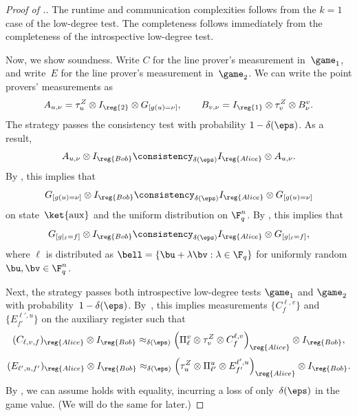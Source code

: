 \begin{proof}[Proof of .]
The runtime and communication complexities follows from the $k=1$ case of the low-degree test.
The completeness follows immediately from the completeness of the introspective low-degree test.

Now, we show soundness.
Write $C$ for the line prover's measurement in~$\game_1$,
and write~$E$ for the line prover's measurement in~$\game_2$.
We can write the point provers' measurements as
\begin{equation*}
A_{u, \nu} = \tau_u^Z \otimes I_{\reg{2}} \otimes G_{[g(u)=\nu]},
\qquad B_{v, \nu} = I_{\reg{1}} \otimes \tau_v^Z \otimes B^v_\nu.
\end{equation*}
The strategy passes the consistency test with probability $1-\delta(\eps)$. As a result,
\begin{equation*}
A_{u, \nu} \otimes I_{\reg{Bob}} \consistency_{\delta(\eps)} I_{\reg{Alice}} \otimes A_{u, \nu}.
\end{equation*}
By , this implies that
\begin{equation}\label{eq:to-use-at-the-very-end-when-you-least-expect-it}
G_{[g(u)=\nu]} \otimes I_{\reg{Bob}} \consistency_{\delta(\eps)} I_{\reg{Alice}} \otimes G_{[g(u)=\nu]}
\end{equation}
on state~$\ket{\mathrm{aux}}$ and the uniform distribution on $\F_q^n$.
By , this implies that
\begin{equation}\label{eq:dunno-what-to-name-this-honestly}
G_{[g|_{\ell}=f]} \otimes I_{\reg{Bob}} \consistency_{\delta(\eps)} I_{\reg{Alice}} \otimes G_{[g|_{\ell}=f]},
\end{equation}
where $\ell$ is distributed as $\bell = \{\bu + \lambda \bv : \lambda \in \F_q\}$ for uniformly random $\bu, \bv \in \F_q^n$.

Next, the strategy passes both introspective low-degree tests $\game_1$ and $\game_2$ with probability~$1-\delta(\eps)$.
By~, this implies measurements $\{C^{\ell,v}_f\}$ and $\{E^{\ell', u}_{f'}\}$ on the auxiliary register such that
\begin{equation}\label{eq:doggone-it-one}
(C_{\ell, v, f})_{\reg{Alice}} \otimes I_{\reg{Bob}}
\approx_{\delta(\eps)} \left(\Pi^v_\ell \otimes \tau_v^Z \otimes C^{\ell,v}_f\right)_{\reg{Alice}} \otimes I_{\reg{Bob}},
\end{equation}
\begin{equation}\label{eq:doggone-it-two}
(E_{\ell', u, f'})_{\reg{Alice}} \otimes I_{\reg{Bob}}
\approx_{\delta(\eps)} \left(\tau_u^Z \otimes \Pi_{\ell'}^u \otimes E^{\ell',u}_{f'}\right)_{\reg{Alice}} \otimes I_{\reg{Bob}}.
\end{equation}
By , we can assume  holds with equality, incurring a loss of only~$\delta(\eps)$ in the game value. (We will do the same for  later.)


\end{proof}
